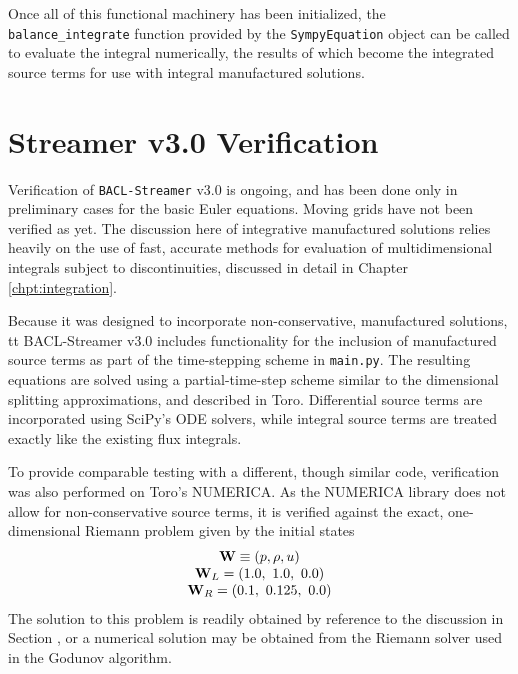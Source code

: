 Once all of this functional machinery has been initialized, the {\tt balance\_integrate} function provided by the {\tt SympyEquation} object can be called to evaluate the integral numerically, the results of which become the integrated source terms for use with integral manufactured solutions.

\section{Streamer v3.0 Verification}
\label{sec:ver-MMS}

Verification of {\tt BACL-Streamer} v3.0 is ongoing, and has been done only in preliminary cases for the basic Euler equations. Moving grids have not been verified as yet. The discussion here of integrative manufactured solutions relies heavily on the use of fast, accurate methods for evaluation of multidimensional integrals subject to discontinuities, discussed in detail in Chapter \ref{chpt:integration}. 

Because it was designed to incorporate non-conservative, manufactured solutions, {tt BACL-Streamer} v3.0 includes functionality for the inclusion of manufactured source terms as part of the time-stepping scheme in {\tt main.py}. The resulting equations are solved using a partial-time-step scheme similar to the dimensional splitting approximations, and described in Toro\cite{Toro2009}. Differential source terms are incorporated using SciPy's ODE solvers, while integral source terms are treated exactly like the existing flux integrals. 

To provide comparable testing with a different, though similar code, verification was also performed on Toro's NUMERICA\cite{Toro2009}\cite{Toro1999}. As the NUMERICA library does not allow for non-conservative source terms, it is verified against the exact, one-dimensional Riemann problem given by the initial states
\[\begin{array}{c}
{\bf{W}} \equiv \left( {p,\rho ,u} \right)\\
{{\bf{W}}_L} = \left( {1.0,\,\,1.0,\,\,0.0} \right)\\
{{\bf{W}}_R} = \left( {0.1,\,\,0.125,\,\,0.0} \right)
\end{array}\]
The solution to this problem is readily obtained by reference to the discussion in Section \label{sec:UCS-Riemann}, or a numerical solution may be obtained from the Riemann solver used in the Godunov algorithm. 

